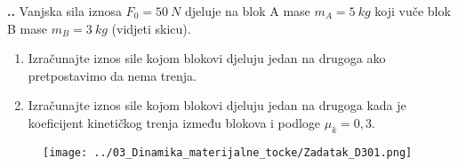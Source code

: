 
\noindent 
\textbf{
\thecjelina.\thezadatak.}
Vanjska sila iznosa $F_0=50\ N$ djeluje na blok A mase $m_A= 5\ kg$ koji vuče blok B mase $m_B= 3\ kg$ (vidjeti skicu). 
\begin{enumerate}[label=\alph*)]
 \item Izračunajte iznos sile kojom blokovi djeluju jedan na drugoga ako pretpostavimo da nema trenja.
 \item Izračunajte iznos sile kojom blokovi djeluju jedan na drugoga kada je koeficijent kinetičkog trenja između blokova i podloge $\mu_k =0,3$.
\end{enumerate}


\begin{figure}[h]%
  \begin{center}
    \texttt{[image: ../03\_Dinamika\_materijalne\_tocke/Zadatak\_D301.png]}
  \end{center}
\end{figure}

